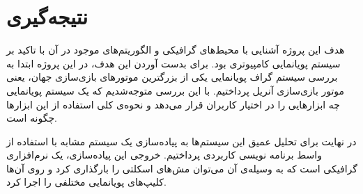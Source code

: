 \chapter {نتیجه‌گیری }

هدف این پروژه آشنایی با محیط‌های گرافیکی و الگوریتم‌های موجود در آن با 
تاکید بر سیستم پویانمایی کامپیوتری بود.
برای بدست آوردن این هدف، در این پروژه ابتدا به بررسی سیستم گراف 
پویانمایی یکی از بزرگترین موتور‌های بازی‌سازی جهان، یعنی موتور بازی‌سازی آنریل 
پرداختیم.
با این بررسی متوجه‌‌شدیم که یک سیستم پویانمایی چه ابزارهایی را در اختیار کاربران 
قرار می‌دهد و نحوه‌ی کلی استفاده از این ابزار‌ها چگونه است.

در نهایت برای تحلیل عمیق این سیستم‌ها به پیاده‌سازی یک سیستم مشابه 
با استفاده از واسط برنامه نویسی کاربردی 
پرداختیم.
خروجی این پیاده‌سازی، یک نرم‌افزاری گرافیکی است که به وسیله‌ی آن 
می‌توان مش‌های اسکلتی را بارگذاری کرد و روی آن‌ها کلیپ‌های 
پویانمایی مختلفی را اجرا کرد.
